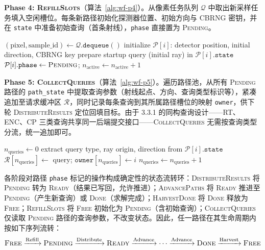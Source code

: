\textbf{Phase 4: \textsc{RefillSlots}}（算法~\ref{alg:wf-p4}）。从像素任务队列 $\mathcal{Q}$ 中取出新采样任务填入空闲槽位。每条新路径初始化探测器位置、初始方向与 CBRNG 密钥，并在 \texttt{state} 中准备初始查询（首条射线），\texttt{phase} 直接置为 \textsc{Pending}。

\begin{algorithm}[htbp]
\caption{\textsc{RefillSlots} — 空闲槽位补充}
\label{alg:wf-p4}
\begin{algorithmic}[1]
    \STATE $(\text{pixel}, \text{sample\_id}) \leftarrow \mathcal{Q}.\texttt{dequeue}()$
    \STATE initialize $\mathcal{P}[i]$: detector position, initial direction, CBRNG key
    \STATE prepare startup query (initial ray) in $\mathcal{P}[i].\texttt{state}$
    \STATE $\mathcal{P}[i].\texttt{phase} \leftarrow \textsc{Pending}$; \quad $n_\text{active} \leftarrow n_\text{active} + 1$
  \ENDIF
\ENDFOR
\end{algorithmic}
\end{algorithm}

\textbf{Phase 5: \textsc{CollectQueries}}（算法~\ref{alg:wf-p5}）。遍历路径池，从所有 \textsc{Pending} 路径的 \texttt{path\_state} 中提取查询参数（射线起点、方向、查询类型标识等），紧凑追加至请求缓冲区 $\mathcal{R}$，同时记录每条查询到其所属路径槽位的映射 \texttt{owner}，供下轮 \textsc{DistributeResults} 定位回填目标。由于 3.3.1 的同构查询设计——RT、ENC、CP 三类查询共享同一后端提交接口——\textsc{CollectQueries} 无需按查询类型分流，统一追加即可。

\begin{algorithm}[htbp]
\caption{\textsc{CollectQueries} — 查询请求提取}
\label{alg:wf-p5}
\begin{algorithmic}[1]
\STATE $n_\text{queries} \leftarrow 0$
    \STATE extract query type, ray origin, direction from $\mathcal{P}[i].\texttt{state}$
    \STATE $\mathcal{R}[n_\text{queries}] \leftarrow$ query; \quad $\texttt{owner}[n_\text{queries}] \leftarrow i$
    \STATE $n_\text{queries} \leftarrow n_\text{queries} + 1$
  \ENDIF
\ENDFOR
\end{algorithmic}
\end{algorithm}

各阶段对路径 \texttt{phase} 标记的操作构成确定性的状态流转环：\textsc{DistributeResults} 将 \textsc{Pending} 转为 \textsc{Ready}（结果已写回，允许推进）；\textsc{AdvancePaths} 将 \textsc{Ready} 推进至 \textsc{Pending}（产生新查询）或 \textsc{Done}（求解完成）；\textsc{HarvestDone} 将 \textsc{Done} 释放为 \textsc{Free}；\textsc{RefillSlots} 将 \textsc{Free} 初始化为 \textsc{Pending}（含初始查询）；\textsc{CollectQueries} 仅读取 \textsc{Pending} 路径的查询参数，不改变状态。因此，任一路径在其生命周期内按如下序列流转：
\begin{equation*}
\textsc{Free} \xrightarrow{\text{Refill}} \textsc{Pending} \xrightarrow{\text{Distribute}} \textsc{Ready} \xrightarrow{\text{Advance}} \cdots \xrightarrow{\text{Advance}} \textsc{Done} \xrightarrow{\text{Harvest}} \textsc{Free}
\end{equation*}

